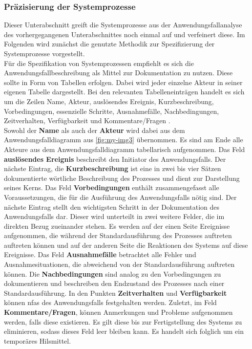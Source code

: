 \documentclass[../../../Bachelorarbeit.tex]{subfiles}
\begin{document}
\subsubsection{Präzisierung der Systemprozesse} \label{AnwfallSpezPraez}
Dieser Unterabschnitt greift die Systemprozesse aus der Anwendungsfallanalyse des vorhergegangenen Unterabschnittes noch einmal auf und verfeinert diese. Im Folgenden wird zunächst die genutzte Methodik zur Spezifizierung der Systemprozesse vorgestellt.\\
Für die Spezifikation von Systemprozessen empfiehlt es sich die Anwendungsfallbeschreibung als Mittel zur Dokumentation zu nutzen. Diese sollte in Form von Tabellen erfolgen. Dabei wird jeder einzelne Akteur in seiner eigenen Tabelle dargestellt. Bei den relevanten Tabelleneinträgen handelt es sich um die Zeilen Name, Akteur, auslösendes Ereignis, Kurzbeschreibung, Vorbedingungen, essenzielle Schritte, Ausnahmefälle, Nachbedingungen, Zeitverhalten, Verfügbarkeit und Kommentare/Fragen \cite[227]{Broy2021}.\\
Sowohl der \textbf{Name} als auch der \textbf{Akteur} wird dabei aus dem Anwendungsfalldiagramm aus \autoref{fig:my-img3} übernommen. Es sind am Ende alle Akteure aus dem Anwendungsfalldiagramm tabellarisch aufgenommen. Das Feld \textbf{auslösendes Ereignis} beschreibt den Initiator des Anwendungsfalls. Der nächste Eintrag, die \textbf{Kurzbeschreibung} ist eine in zwei bis vier Sätzen dokumentierte wörtliche Beschreibung des Prozesses und dient zur Darstellung seines Kerns. Das Feld \textbf{Vorbedingungen} enthält zusammengefasst alle Voraussetzungen, die für die Ausführung des Anwendungsfalls nötig sind. Der nächste Eintrag stellt den wichtigsten Schritt in der Dokumentation des Anwendungsfalls dar. Dieser wird unterteilt in zwei weitere Felder, die im direkten Bezug zueinander stehen. Es werden auf der einen Seite Ereignisse aufgenommen, die während der Standardausführung des Prozesses auftreten \bzw auftreten können und auf der anderen Seite die Reaktionen des Systems auf diese Ereignisse. Das Feld \textbf{Ausnahmefälle} betrachtet alle Fehler und Ausnahmesituationen, die abweichend von der Standardausführung auftreten können. Die \textbf{Nachbedingungen} sind analog zu den Vorbedingungen zu dokumentieren und beschreiben den Endzustand des Prozesses nach einer Standardausführung. In den Punkten \textbf{Zeitverhalten} und \textbf{Verfügbarkeit} können \acp{nfa} des Anwendungsfalls festgehalten werden. Zuletzt, im Feld \textbf{Kommentare/Fragen}, können Anmerkungen und Probleme aufgenommen werden, falls diese existieren. Es gilt diese bis zur Fertigstellung des Systems zu eliminieren, sodass dieses Feld leer bleiben kann. Es handelt sich folglich um ein temporäres Hilsmittel.\\
\end{document}
